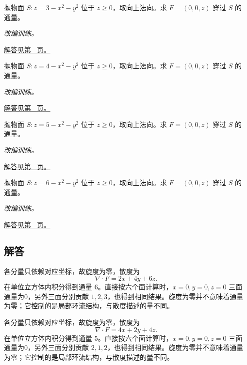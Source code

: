 \documentclass[UTF8,12pt,a4paper,fontset=fandol]{ctexart}
\begin{document}
\begin{example}[封闭曲面与缺失底面]\label{ex:c44q21}
抛物面 $S:z=3-x^2-y^2$ 位于 $z\ge0$，取向上法向。求 $F=(0,0,z)$ 穿过 $S$ 的通量。
\par\textit{改编训练。}\par\hyperref[ans:c44q21]{解答见第~\pageref{ans:c44q21} 页。}
\end{example}
\begin{example}[封闭曲面与缺失底面]\label{ex:c44q22}
抛物面 $S:z=4-x^2-y^2$ 位于 $z\ge0$，取向上法向。求 $F=(0,0,z)$ 穿过 $S$ 的通量。
\par\textit{改编训练。}\par\hyperref[ans:c44q22]{解答见第~\pageref{ans:c44q22} 页。}
\end{example}
\begin{example}[封闭曲面与缺失底面]\label{ex:c44q23}
抛物面 $S:z=5-x^2-y^2$ 位于 $z\ge0$，取向上法向。求 $F=(0,0,z)$ 穿过 $S$ 的通量。
\par\textit{改编训练。}\par\hyperref[ans:c44q23]{解答见第~\pageref{ans:c44q23} 页。}
\end{example}
\begin{example}[封闭曲面与缺失底面]\label{ex:c44q24}
抛物面 $S:z=6-x^2-y^2$ 位于 $z\ge0$，取向上法向。求 $F=(0,0,z)$ 穿过 $S$ 的通量。
\par\textit{改编训练。}\par\hyperref[ans:c44q24]{解答见第~\pageref{ans:c44q24} 页。}
\end{example}
\subsection{解答}
\begin{solve}\label{ans:c44q1}
各分量只依赖对应坐标，故旋度为零，散度为
\[
\nabla\cdot F=2x+4y+6z.
\]
在单位立方体内积分得到通量 $6$。直接按六个面计算时，$x=0,y=0,z=0$ 三面通量为0，另外三面分别贡献 $1,2,3$，也得到相同结果。旋度为零并不意味着通量为零；它控制的是局部环流结构，与散度描述的量不同。
\end{solve}

\begin{solve}\label{ans:c44q2}
各分量只依赖对应坐标，故旋度为零，散度为
\[
\nabla\cdot F=4x+2y+4z.
\]
在单位立方体内积分得到通量 $5$。直接按六个面计算时，$x=0,y=0,z=0$ 三面通量为0，另外三面分别贡献 $2,1,2$，也得到相同结果。旋度为零并不意味着通量为零；它控制的是局部环流结构，与散度描述的量不同。
\end{solve}
\end{document}
